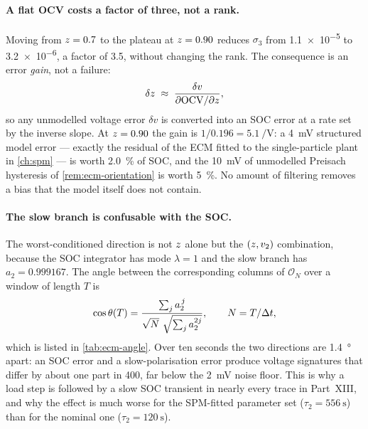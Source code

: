 \paragraph{A flat OCV costs a factor of three, not a rank.} Moving from $z=0.7$ to the
plateau at $z=0.90$ reduces $\sigma_3$ from \num{1.1e-5} to \num{3.2e-6}, a factor of
\num{3.5}, without changing the rank. The consequence is an error \emph{gain}, not a failure:
\begin{equation}
\delta z \;\approx\; \frac{\delta v}{\partial\mathrm{OCV}/\partial z},
\label{eq:ecm-errgain}
\end{equation}
so any unmodelled voltage error $\delta v$ is converted into an SOC error at a rate set by the
inverse slope. At $z=0.90$ the gain is $1/\num{0.196} = \SI{5.1}{\per\volt}$: a
\SI{4}{\milli\volt} structured model error --- exactly the residual of the ECM fitted to the
single-particle plant in \cref{ch:spm} --- is worth \SI{2.0}{\percent} of SOC, and the
\SI{10}{\milli\volt} of unmodelled Preisach hysteresis of \cref{rem:ecm-orientation} is worth
\SI{5}{\percent}. No amount of filtering removes a bias that the model itself does not contain.

\paragraph{The slow branch is confusable with the SOC.} The worst-conditioned direction is not
$z$ alone but the $(z, v_2)$ combination, because the SOC integrator has mode
$\lambda=1$ and the slow branch has $a_2 = 0.999167$. The angle between the corresponding columns
of $\mathcal{O}_N$ over a window of length $T$ is
\begin{equation}
\cos\theta(T) = \frac{\sum_{j} a_2^{\,j}}{\sqrt{N}\ \sqrt{\sum_j a_2^{2j}}},
\qquad N = T/\Delta t,
\label{eq:ecm-angle}
\end{equation}
which is listed in \cref{tab:ecm-angle}. Over ten seconds the two directions are
\SI{1.4}{\degree} apart: an SOC error and a slow-polarisation error produce voltage signatures
that differ by about one part in \num{400}, far below the \SI{2}{\milli\volt} noise floor. This
is why a load step is followed by a slow SOC transient in nearly every trace in Part~XIII, and
why the effect is much worse for the SPM-fitted parameter set ($\tau_2 = \SI{556}{\second}$) than
for the nominal one ($\tau_2 = \SI{120}{\second}$).

